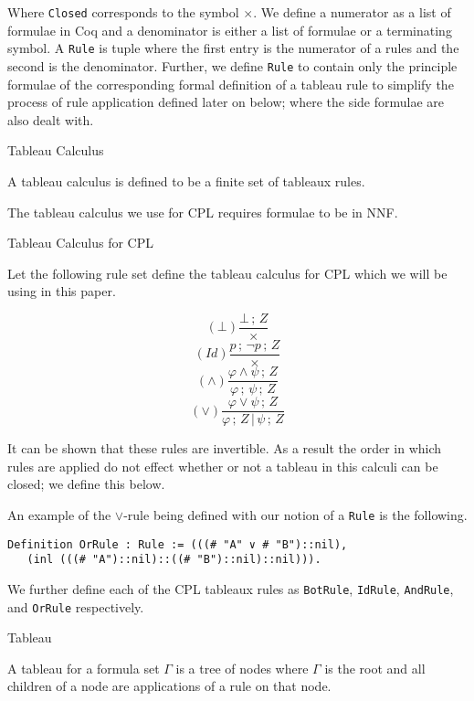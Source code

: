 \documentclass{llncs}
\begin{document}
Where \verb+Closed+ corresponds to the symbol $\times$. We define a numerator
as a list of formulae in Coq and a denominator is either a list of formulae or
a terminating symbol. A \verb+Rule+ is tuple where the first entry is the
numerator of a rules and the second is the denominator. Further, we define
\verb+Rule+ to contain only the principle formulae of the corresponding formal
definition of a tableau rule to simplify the process of rule application
defined later on below; where the side formulae are also dealt with.

\begin{definition}{Tableau Calculus}

A tableau calculus is defined to be a finite set of tableaux rules.
\end{definition}
%
The tableau calculus we use for CPL requires formulae to be in NNF.
%
\begin{definition}{Tableau Calculus for CPL}\label{Tableau Calculus for CPL}

Let the following rule set define the tableau calculus for CPL which we will be
using in this paper.
%
\begin{multicols}{4}
\noindent
\begin{equation*}
(\bot)\frac{\bot\,;\,Z}{\times}
\end{equation*}
\begin{equation*}
(Id)\frac{p\,;\,\neg p\,;\,Z}{\times}
\end{equation*}
\begin{equation*}
(\wedge)\frac{\varphi \wedge \psi\,;\,Z}{\varphi\,;\,\psi\,;\,Z}
\end{equation*}
\begin{equation*}
(\vee)\frac{\varphi \vee \psi\,;\,Z}{\varphi\,;\,Z\,|\,\psi\,;\,Z}
\end{equation*}
\end{multicols}
%
It can be shown that these rules are invertible. As a result the order in which
rules are applied do not effect whether or not a tableau in this calculi can be
closed; we define this below.
\end{definition}

An example of the $\lor$-rule being defined with our notion of a \verb+Rule+ is
the following.
\begin{verbatim}
Definition OrRule : Rule := (((# "A" ∨ # "B")::nil),
   (inl (((# "A")::nil)::((# "B")::nil)::nil))).
\end{verbatim}

We further define each of the CPL tableaux rules as \verb+BotRule+,
\verb+IdRule+, \verb+AndRule+, and \verb+OrRule+ respectively.
%
\begin{definition}{Tableau}

A tableau for a formula set $\Gamma$ is a tree of nodes where $\Gamma$ is the
root and all children of a node are applications of a rule on that node.
\end{definition}
\end{document}
